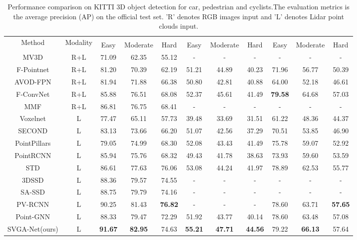 \documentclass{article}
\begin{document}
\begin{wraptable}{r}{9.5cm}
\setlength{\abovecaptionskip}{-5pt}
\setlength{\belowcaptionskip}{-0pt}
	\scriptsize
\caption{Performance comparison on KITTI 3D object detection for car, pedestrian and cyclists.The evaluation metrics is the average precision (AP) on the official test set. 'R' denotes RGB images input and 'L' denotes Lidar point clouds input.}
\label{tab:one}
\begin{center}
\setlength{\tabcolsep}{0.2mm}
\begin{tabular}{ccccccccccc} \toprule
            \multirow{2}{*}{Method} & \multirow{2}{*}{Modality} & \multicolumn{3}{c}{} & \multicolumn{3}{c}{} & \multicolumn{3}{c}{} \\
            \cmidrule(r){3-5} \cmidrule(r){6-8} \cmidrule(r){9-11}
                  &    & Easy & Moderate & Hard & Easy & Moderate & Hard & Easy & Moderate & Hard\\ \hline
MV3D\cite{chen2017multi} & R+L  &71.09 & 62.35  & 55.12 & -  & - & -  & - & - & -\\
F-Pointnet\cite{qi2018frustum} & R+L  &81.20 & 70.39  & 62.19 & 51.21 & 44.89 & 40.23  & 71.96 & 56.77 & 50.39\\
AVOD-FPN\cite{ku2018joint} & R+L  & 81.94 & 71.88  & 66.38 & 50.80 & 42.81 & 40.88  & 64.00 & 52.18 & 46.61\\
F-ConvNet\cite{wang2019frustum} & R+L  &85.88 &76.51 & 68.08 & 52.37 & 45.61 & 41.49 & {\bf79.58} & 64.68 & 57.03\\
MMF\cite{liang2019multi} & R+L  &86.81 & 76.75  & 68.41 & -  & - & - & - & - & -\\\hline
Voxelnet\cite{zhou2018voxelnet} &   L  &77.47 & 65.11  & 57.73 & 39.48 & 33.69 & 31.51  & 61.22 & 48.36 & 44.37\\
SECOND\cite{yan2018second} &   L  & 83.13 & 73.66  & 66.20 & 51.07 & 42.56 & 37.29  & 70.51 & 53.85 & 46.90\\
PointPillars\cite{lang2019pointpillars} &   L  &79.05 & 74.99  & 68.30 & 52.08 & 43.43 & 41.49 & 75.78 & 59.07 & 52.92\\
PointRCNN\cite{shi2019pointrcnn} &   L &85.94 & 75.76  & 68.32 & 49.43 & 41.78 & 38.63 & 73.93 & 59.60 & 53.59\\
STD\cite{yang2019std} &   L  & 86.61 & 77.63  & 76.06 & 53.08 & 44.24 & 41.97 & 78.89 & 62.53 & 55.77\\
3DSSD\cite{yang20203dssd} & L & 88.36 & 79.57 & 74.55 & - & - & - & - & - & - \\
SA-SSD\cite{hestructure} & L & 88.75 & 79.79 & 74.16  & - & - & - & - & - & - \\
PV-RCNN \cite{shi2019pv} &  L   &  90.25 & 81.43 & {\bf76.82} & - & - & - & 78.60 & 63.71 & {\bf57.65}  \\
Point-GNN\cite{Point-GNN} & L &88.33 & 79.47 & 72.29 & 51.92 & 43.77 & 40.14 & 78.60 & 63.48 & 57.08\\\hline
SVGA-Net(ours) &  L & {\bf91.67} & {\bf82.95}  & 74.63 & {\bf55.21}  & {\bf47.71} & {\bf44.56} & 79.22 & {\bf66.13} & 57.64\\
            \bottomrule
        \end{tabular}
\end{center}
\end{wraptable}
\end{document}
